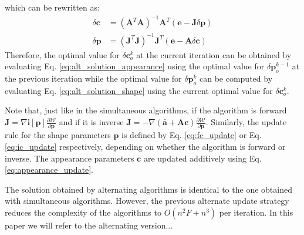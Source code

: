which can be rewritten as:
\begin{equation}
    \begin{aligned}
        \delta\mathbf{c} & = (\mathbf{A}^T\mathbf{A})^{-1} \mathbf{A}^T \left( \mathbf{e} - \mathbf{J} \delta\mathbf{p} \right) 
        \label{eq:alt_solution_appearance}
        \\
        \delta\mathbf{p} & = (\mathbf{J}^T\mathbf{J})^{-1} \mathbf{J}^T \left( \mathbf{e} - \mathbf{A} \delta\mathbf{c} \right)
    \end{aligned}
\end{equation}
Therefore, the optimal value for $\delta\mathbf{c}_o^k$ at the current iteration can be obtained by evaluating Eq. \ref{eq:alt_solution_appearance} using the optimal value for $\delta\mathbf{p}_o^{k-1}$ at the previous iteration while the optimal value for $\delta\mathbf{p}_o^k$ can be computed by evaluating Eq. \ref{eq:alt_solution_shape} using the current optimal value for $\delta\mathbf{c}_o^k$.

Note that, just like in the simultaneous algorithms, if the algorithm is forward $\mathbf{J} = \nabla\mathbf{i}[\mathbf{p}] \frac{\partial\mathcal{W}}{\partial\mathbf{p}}$ and if it is inverse  $\mathbf{J} = -\nabla\left(\bar{\mathbf{a}} + \mathbf{A}\mathbf{c} \right) \frac{\partial\mathcal{W}}{\partial\mathbf{p}}$. Similarly, the update rule for the shape parameters $\mathbf{p}$ is defined by Eq. \ref{eq:fc_update} or Eq. \ref{eq:ic_update} respectively, depending on whether the algorithm is forward or inverse. The appearance parameters $\mathbf{c}$ are updated additively using Eq. \ref{eq:appearance_update}.

The solution obtained by alternating algorithms is identical to the one obtained with simultaneous algorithms. However, the previous alternate update strategy reduces the complexity of the algorithms to $O(n^2F + n^3)$ per iteration. In this paper we will refer to the alternating version...

